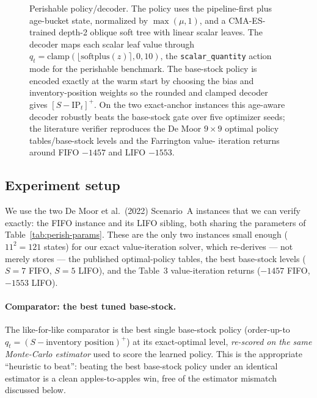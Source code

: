 \documentclass[11pt]{article}
\begin{document}
\begin{figure}[t]
{%
  }
  \caption{Perishable policy/decoder. The policy uses the pipeline-first plus age-bucket state,
  normalized by $\max(\mu,1)$, and a CMA-ES-trained depth-2 oblique soft tree with linear scalar
  leaves. The decoder maps each scalar leaf value through
  $q_t=\mathrm{clamp}(\lfloor\mathrm{softplus}(z)\rceil,0,10)$, the
  \texttt{scalar\_quantity} action mode for the perishable benchmark. The base-stock policy is encoded
  exactly at the warm start by choosing the bias and inventory-position weights so the rounded and
  clamped decoder gives $[S-\mathrm{IP}_t]^+$. On the two exact-anchor instances this age-aware
  decoder robustly beats the base-stock gate over five optimizer seeds; the literature verifier
  reproduces the De Moor $9\times9$ optimal policy tables/base-stock levels and the Farrington value-
  iteration returns around FIFO $-1457$ and LIFO $-1553$.}
  \label{fig:perish-policy-decoder}
\end{figure}

\subsection{Experiment setup}
\label{sec:perishable-setup}

We use the two De Moor et al.\ (2022) Scenario~A instances that we can verify exactly: the FIFO
instance and its LIFO sibling, both sharing the parameters of
Table~\ref{tab:perish-params}. These are the only two instances small enough ($11^2=121$ states) for
our exact value-iteration solver, which re-derives --- not merely stores --- the published
optimal-policy tables, the best base-stock levels ($S=7$ FIFO, $S=5$ LIFO), and the
\citet{farrington2025perishable} Table~3 value-iteration returns ($-1457$ FIFO, $-1553$ LIFO).

\paragraph{Comparator: the best tuned base-stock.}
The like-for-like comparator is the best single base-stock policy (order-up-to
$q_t=(S-\text{inventory position})^+$) at its exact-optimal level, \emph{re-scored on the same
Monte-Carlo estimator} used to score the learned policy. This is the appropriate ``heuristic to
beat'': beating the best base-stock policy under an identical estimator is a clean apples-to-apples
win, free of the estimator mismatch discussed below.
\end{document}
